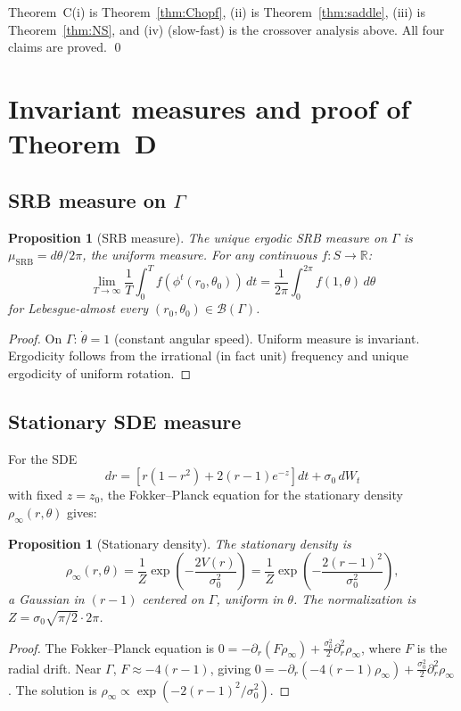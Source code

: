 \documentclass[reqno]{amsart}
\numberwithin{equation}{section}
\theoremstyle{plain}
\newtheorem{proposition}[theorem]{Proposition}
\theoremstyle{definition}
\theoremstyle{remark}
\newcommand{\R}{\mathbb{R}}
\newcommand{\Orb}{\Gamma}
\newcommand{\cB}{\mathcal{B}}
\begin{document}
Theorem~C(i) is Theorem~\ref{thm:Chopf}, (ii) is Theorem~\ref{thm:saddle},
(iii) is Theorem~\ref{thm:NS}, and (iv) (slow-fast) is the crossover
analysis above. All four claims are proved. \qed

\section{Invariant measures and proof of Theorem~D}\label{sec:measures}

\subsection{SRB measure on \texorpdfstring{$\Orb$}{Gamma}}

\begin{proposition}[SRB measure]\label{prop:SRB}
The unique ergodic SRB measure on $\Orb$ is $\mu_{\mathrm{SRB}}=d\theta/2\pi$,
the uniform measure. For any continuous $f\colon S\to\R$:
\[
  \lim_{T\to\infty}\frac{1}{T}\int_0^T f(\phi^t(r_0,\theta_0))\,dt
  = \frac{1}{2\pi}\int_0^{2\pi}f(1,\theta)\,d\theta
\]
for Lebesgue-almost every $(r_0,\theta_0)\in\cB(\Orb)$.
\end{proposition}
\begin{proof}
On $\Orb$: $\dot\theta=1$ (constant angular speed). Uniform measure
is invariant. Ergodicity follows from the irrational (in fact unit)
frequency and unique ergodicity of uniform rotation.
\end{proof}

\subsection{Stationary SDE measure}

For the SDE
\[
  dr = \left[r(1-r^2)+2(r-1)e^{-z}\right]dt + \sigma_0\,dW_t
\]
with fixed $z=z_0$, the Fokker--Planck equation for the stationary
density $\rho_\infty(r,\theta)$ gives:

\begin{proposition}[Stationary density]\label{prop:stationary}
The stationary density is
\[
  \rho_\infty(r,\theta)
  = \frac{1}{Z}\exp\!\left(-\frac{2V(r)}{\sigma_0^2}\right)
  = \frac{1}{Z}\exp\!\left(-\frac{2(r-1)^2}{\sigma_0^2}\right),
\]
a Gaussian in $(r-1)$ centered on $\Orb$, uniform in $\theta$.
The normalization is $Z=\sigma_0\sqrt{\pi/2}\cdot 2\pi$.
\end{proposition}
\begin{proof}
The Fokker--Planck equation is $0=-\partial_r(F\rho_\infty)
+\frac{\sigma_0^2}{2}\partial_r^2\rho_\infty$, where $F$ is the
radial drift. Near $\Orb$, $F\approx -4(r-1)$, giving
$0=-\partial_r(-4(r-1)\rho_\infty)+\frac{\sigma_0^2}{2}\partial_r^2\rho_\infty$.
The solution is $\rho_\infty\propto\exp(-2(r-1)^2/\sigma_0^2)$.
\end{proof}
\end{document}
